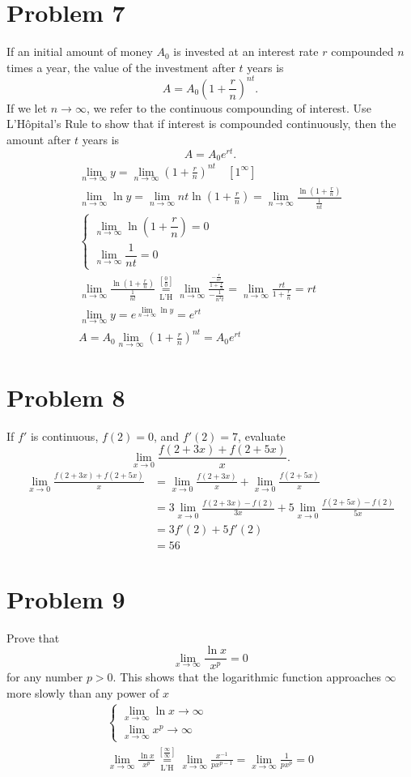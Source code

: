 \documentclass[12pt]{article}
\newcommand*{\lheqzero}{\ensuremath{\underset{\text{L'H}}{\overset{\left[\frac00\right]}{=}}}}
\newcommand*{\lheqinfty}{\ensuremath{\underset{\text{L'H}}{\overset{\left[\frac{\infty}{\infty}\right]}{=}}}}
\newcommand{\problem}[1]{\section{Problem #1}}
\begin{document}
\problem{7}
If an initial amount of money $A_0$ is invested at an interest rate $r$ compounded $n$ times a year, the value of the investment after $t$ years is
$$A = A_0 \left( 1 + \frac{r}{n} \right)^{nt}.$$
If we let $n \to \infty$, we refer to the continuous compounding of interest. Use L'Hôpital's Rule to show that if interest is compounded continuously, then the amount after $t$ years is
$$A = A_0 e^{rt}.$$
\begin{gather*}
    \lim\limits_{n \to \infty}y=\lim\limits_{n \to \infty}(1+\frac{r}{n})^{nt}\quad [1^\infty]\\
    \lim\limits_{n \to \infty}\ln y=\lim\limits_{n \to \infty} nt \ln (1+\frac{r}{n})=\lim\limits_{n \to \infty}\frac{\ln (1+\frac{r}{n})}{\frac{1}{nt}}\\
    \begin{cases}
        \lim\limits_{n \to \infty} \ln (1+\dfrac{r}{n})=0\\
        \lim\limits_{n \to \infty}\dfrac{1}{nt}=0
    \end{cases}\\
    \lim\limits_{n \to \infty}\frac{\ln (1+\frac{r}{n})}{\frac{1}{nt}} \lheqzero \lim\limits_{n \to \infty}\frac{\frac{-\frac{r}{n^2}}{1+\frac{r}{n}}}{-\frac{1}{n^2t}}= \lim\limits_{n \to \infty} \frac{rt}{1+\frac{r}{n}}=rt\\
    \lim\limits_{n \to \infty} y = e^{\lim\limits_{n \to \infty} \ln y} = e^{rt}\\
    A=A_0 \lim\limits_{n \to \infty}(1+\frac{r}{n})^{nt} =\boxed{A_0e^{rt}}
\end{gather*}

\problem{8}
If $f'$ is continuous, $f(2) = 0$, and $f'(2) = 7$, evaluate
$$\lim_{x \to 0} \frac{f(2 + 3x) + f(2 + 5x)}{x}.$$
\begin{align*}
    \lim_{x \to 0} \frac{f(2 + 3x) + f(2 + 5x)}{x}&= \lim_{x \to 0}\frac{f(2+3x)}{x}+\lim_{x \to 0}\frac{f(2+5x)}{x}\\
    &=3\lim_{x \to 0}\frac{f(2+3x)-f(2)}{3x} +5\lim_{x \to 0}\frac{f(2+5x)-f(2)}{5x}\\
    &=3f'(2)+5f'(2)\\
    &=\boxed{56}
\end{align*}

\problem{9}
Prove that
$$\lim_{x \to \infty} \frac{\ln x}{x^p} = 0$$
for any number $p > 0$. This shows that the logarithmic function approaches $\infty$ more slowly than any power of $x$
\begin{gather*}
    \begin{cases}
        \lim\limits_{x \to \infty} \ln x \to \infty\\
        \lim\limits_{x \to \infty} x^p \to \infty
    \end{cases}\\
    \lim\limits_{x \to \infty} \frac{\ln x}{x^p}\lheqinfty \lim\limits_{x \to \infty} \frac{x^{-1}}{px^{p-1}}=\lim\limits_{x \to \infty}\frac{1}{px^p}=\boxed{0}
\end{gather*}
\end{document}
